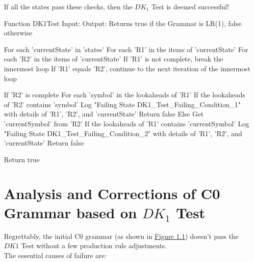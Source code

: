 If all the states pass these checks, then the \(DK_{1}\) Test is deemed successful!\\

\begin{codeblock}
    Function DK1Test
    Input:
    Output: Returns true if the Grammar is LR(1), false otherwise

    For each 'currentState' in 'states'
    For each 'R1' in the items of 'currentState'
    For each 'R2' in the items of 'currentState'
    If 'R1' is not complete, break the innermost loop
    If 'R1' equals 'R2', continue to the next iteration of the innermost loop

    If 'R2' is complete
    For each 'symbol' in the lookaheads of 'R1'
    If the lookaheads of 'R2' contains 'symbol'
    Log "Failing State DK1_Test_Failing_Condition_1" with details of 'R1', 'R2', and 'currentState'
    Return false
    Else
    Get 'currentSymbol' from 'R2'
    If the lookaheads of 'R1' contains 'currentSymbol'
    Log "Failing State DK1_Test_Failing_Condition_2" with details of 'R1', 'R2', and 'currentState'
    Return false

    Return true
\end{codeblock}

\newpage


\section{Analysis and Corrections of C0 Grammar based on \(DK_{1}\) Test}\label{sec:Analysis and Corrections of C0 Grammar based on DK1 Test}

Regrettably, the initial C0 grammar (as shown in \hyperref[fig:grammar_c0]{Figure 1.1}) doesn’t pass the \(DK1\) Test without a few production rule adjustments.\\

The essential causes of failure are:

